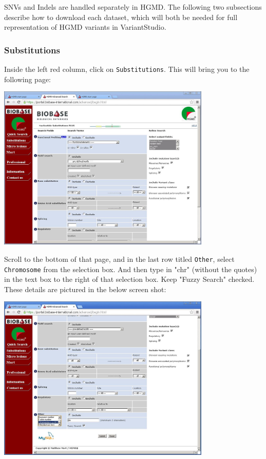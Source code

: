 \documentclass[11pt,titlepage,a4paper]{article}
\begin{document}
SNVs and Indels are handled separately in HGMD. The following two subsections describe how to download each dataset, which will both be needed for full representation of HGMD variants in VariantStudio.

\subsubsection{Substitutions}

Inside the left red column, click on \texttt{Substitutions}. This will bring you to the following page:

\begin{center}
\includegraphics[width=4in]{advancedsnp.JPG}
\end{center}

Scroll to the bottom of that page, and in the last row titled \texttt{Other}, select \texttt{Chromosome} from the selection box. And then type in "chr" (without the quotes) in the text box to the right of that selection box. Keep "Fuzzy Search" checked. These details are pictured in the below screen shot:

\begin{center}
\includegraphics[width=4in]{advancedsnpchr.JPG}
\end{center}
\end{document}
